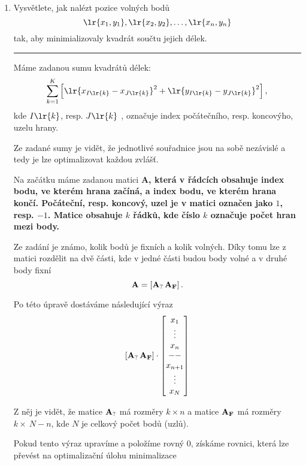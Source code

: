 \begin{enumerate}
    \item Vysvětlete, jak nalézt pozice volných bodů
    \[\lr{x_1, y_1}, \lr{x_2, y_2}, \dots, \lr{x_n, y_n} \]
    tak, aby minimializovaly kvadrát součtu jejich délek.

    \noindent\rule{\textwidth}{1pt}

    Máme zadanou sumu kvadrátů délek:
    \[ \sum_{k = 1}^K \left[ \lr{x_{I \lr{k}} - x_{J \lr{k}}}^2 + \lr{y_{I \lr{k}} - y_{J \lr{k}}}^2 \right], \]
    kde \(I \lr{k}\), resp. \(J \lr{k}\ \), označuje index počátečního, resp. koncovýho, uzelu hrany.

    Ze zadané sumy je vidět, že jednotlivé souřadnice jsou na sobě nezávislé a tedy je lze optimalizovat každou zvlášť.

    Na začátku máme zadanou matici \bf{A}, která v řádcích obsahuje index bodu, ve kterém hrana začíná, a index bodu, ve kterém hrana končí. Počáteční, resp. koncový, uzel je v matici označen jako \( 1 \), resp. \( -1 \).
    Matice obsahuje \( k \) řádků, kde číslo \( k \) označuje počet hran mezi body.
    
    Ze zadání je známo, kolik bodů je fixních a kolik volných. Díky tomu lze z matici rozdělit na dvě části, kde v jedné části budou body volné a v druhé body fixní
    \[ \bf{A} = \left[ \bf{A}_? \, \bf{A}_F \right]. \]

    Po této úpravě dostáváme následující výraz
    \[
        \left[ \bf{A}_? \, \bf{A}_F \right] \cdot
        \begin{bmatrix}
            x_1 \\
            \vdots \\
            x_n \\
            -- \\
            x_{n + 1}\\
            \vdots \\
            x_N
        \end{bmatrix}      
    \]

    Z něj je vidět, že matice \( \bf{A}_? \) má rozměry \( k \times n \) a matice \( \bf{A}_F \) má rozměry \( k \times \ N - n \), kde \( N \) je celkový počet bodů (uzlů).

    Pokud tento výraz upravíme a položíme rovný 0, získáme rovnici, která lze převést na optimalizační úlohu minimalizace


\end{enumerate}
